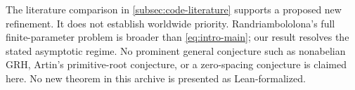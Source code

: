 \documentclass[11pt]{article}
\theoremstyle{definition}
\theoremstyle{remark}
\begin{document}
The literature comparison in \cref{subsec:code-literature} supports a
proposed new refinement. It does not establish worldwide priority.
Randriambololona's full finite-parameter problem is broader than
\eqref{eq:intro-main}; our result resolves the stated asymptotic regime.
No prominent general conjecture such as nonabelian GRH, Artin's
primitive-root conjecture, or a zero-spacing conjecture is claimed here.
No new theorem in this archive is presented as Lean-formalized.








{\raggedright}
\end{document}

